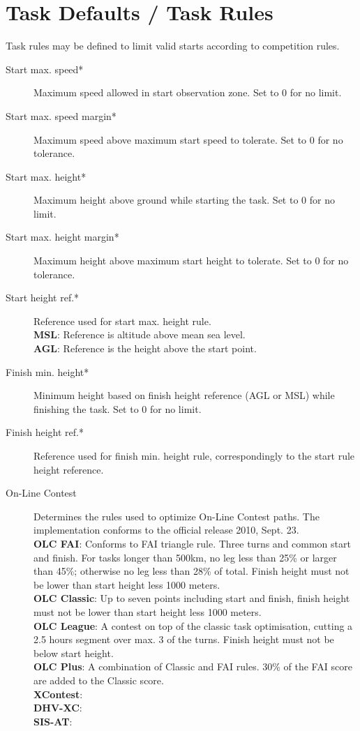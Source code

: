 \section{Task Defaults / Task Rules}

Task rules may be defined to limit valid starts according to competition
rules. \label{conf:taskrules}

\begin{description}
\item[Start max. speed*]  Maximum speed allowed in start observation zone.  Set 
  to 0 for no limit.
\item[Start max. speed margin*] Maximum speed above maximum start speed to tolerate. 
  Set to 0 for no tolerance.
\item[Start max. height*]  Maximum height above ground while starting the task. 
  Set to 0 for no limit.
\item[Start max. height margin*]  Maximum height above maximum start height to 
  tolerate.  Set to 0 for no tolerance.
\item[Start height ref.*]  Reference used for start max. height rule. \\
  {\bf MSL}: Reference is altitude above mean sea level. \\
  {\bf AGL}: Reference is the height above the start point.
\item[Finish min. height*]  Minimum height based on finish height reference 
  (AGL or MSL) while finishing the task.  Set to 0 for no limit.
\item[Finish height ref.*]  Reference used for finish min. height rule, 
  correspondingly to the start rule height reference.
\item[On-Line Contest] Determines the rules used to optimize On-Line Contest 
  paths.  The implementation  conforms to the official release 2010, Sept. 23. \\
  {\bf OLC FAI}: Conforms to FAI triangle rule. Three turns and common start and 
  finish.  For tasks longer than
  500km, no leg less than 25\% or larger than 45\%; otherwise no leg less than 28\% 
  of total.  Finish height must not be lower than start height less 1000 meters. \\
  {\bf OLC Classic}: Up to seven points including start and finish, finish height
  must not be lower than start height less 1000 meters. \\
  {\bf OLC League}: A contest on top of the classic task optimisation, cutting
  a 2.5 hours segment over max. 3 of the turns. Finish height must not be below
  start height. \\
  {\bf OLC Plus}: A combination of Classic and FAI rules. 30\% of the FAI score
  are added to the Classic score. \\
  {\bf XContest}:  \\
  {\bf DHV-XC}:  \\
  {\bf SIS-AT}:  \\
\end{description}


